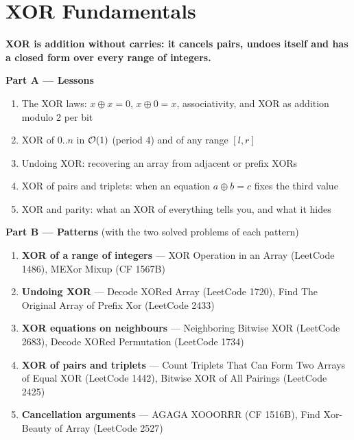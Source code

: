 \chapter{XOR Fundamentals}
\label{ch:xor}

\begin{tcolorbox}[enhanced, colback=white, colframe=secondaryblue, boxrule=1pt, arc=2mm]
\textbf{\large\textcolor{primaryblue}{XOR is addition without carries: it cancels pairs, undoes itself and has a closed form over every range of integers.}}
\end{tcolorbox}


\begin{plannedbox}
\textbf{Part A --- Lessons}
\begin{enumerate}[leftmargin=*, label=\textbf{A\arabic*.}, itemsep=1pt]
    \item The XOR laws: $x \oplus x = 0$, $x \oplus 0 = x$, associativity, and XOR as addition modulo 2 per bit
    \item XOR of $0..n$ in $\mathcal{O}(1)$ (period 4) and of any range $[l, r]$
    \item Undoing XOR: recovering an array from adjacent or prefix XORs
    \item XOR of pairs and triplets: when an equation $a \oplus b = c$ fixes the third value
    \item XOR and parity: what an XOR of everything tells you, and what it hides
\end{enumerate}
\textbf{Part B --- Patterns} (with the two solved problems of each pattern)
\begin{enumerate}[leftmargin=*, label=\textbf{P\arabic*.}, itemsep=1pt]
    \item \textbf{XOR of a range of integers} --- XOR Operation in an Array {\small\color{darkgray}(LeetCode 1486)}, MEXor Mixup {\small\color{darkgray}(CF 1567B)}
    \item \textbf{Undoing XOR} --- Decode XORed Array {\small\color{darkgray}(LeetCode 1720)}, Find The Original Array of Prefix Xor {\small\color{darkgray}(LeetCode 2433)}
    \item \textbf{XOR equations on neighbours} --- Neighboring Bitwise XOR {\small\color{darkgray}(LeetCode 2683)}, Decode XORed Permutation {\small\color{darkgray}(LeetCode 1734)}
    \item \textbf{XOR of pairs and triplets} --- Count Triplets That Can Form Two Arrays of Equal XOR {\small\color{darkgray}(LeetCode 1442)}, Bitwise XOR of All Pairings {\small\color{darkgray}(LeetCode 2425)}
    \item \textbf{Cancellation arguments} --- AGAGA XOOORRR {\small\color{darkgray}(CF 1516B)}, Find Xor-Beauty of Array {\small\color{darkgray}(LeetCode 2527)}
\end{enumerate}
\end{plannedbox}
